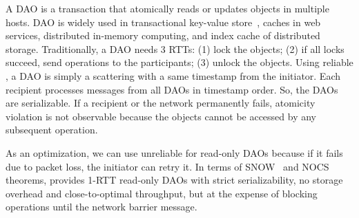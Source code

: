 A DAO is a transaction that atomically reads or updates objects in multiple hosts.
DAO is widely used in transactional key-value store~\cite{dey2014ycsbt}, caches in web services, distributed in-memory computing, and index cache of distributed storage.
Traditionally, a DAO needs 3 RTTs: (1) lock the objects; (2) if all locks succeed, send operations to the participants; (3) unlock the objects.
Using reliable \sys{}, a DAO is simply a scattering with a same timestamp from the initiator.
Each recipient processes messages from all DAOs in timestamp order. So, the DAOs are serializable.
If a recipient or the network permanently fails, atomicity violation is not observable because the objects cannot be accessed by any subsequent operation.


As an optimization, we can use unreliable \sys{} for read-only DAOs because if it fails due to packet loss, the initiator can retry it.
In terms of SNOW~\cite{lu2016snow} and NOCS~\cite{lu2020performance} theorems, \sys{} provides 1-RTT read-only DAOs with strict serializability, no storage overhead and close-to-optimal throughput, but at the expense of blocking operations until the network barrier message.





